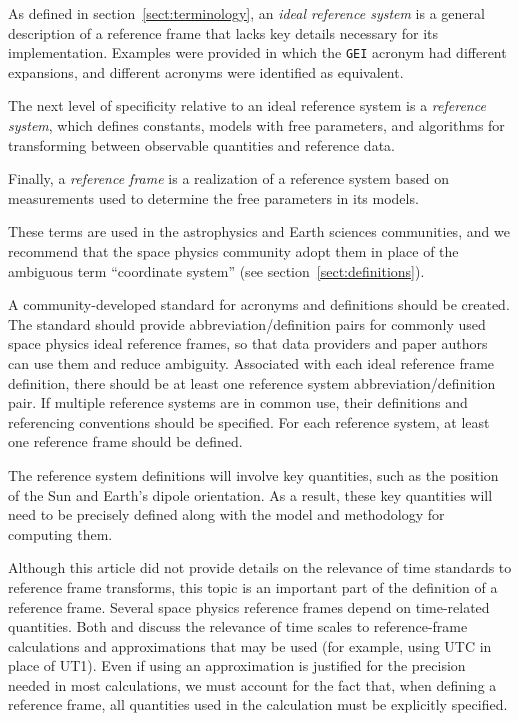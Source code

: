 \documentclass[draft]{agujournal2019}
\begin{document}
As defined in section~\ref {sect:terminology}, an {\it ideal reference system} is a general description of a reference frame that lacks key details necessary for its implementation. Examples were provided in which the \texttt{GEI} acronym had different expansions, and different acronyms were identified as equivalent.
  
The next level of specificity relative to an ideal reference system is a {\it reference system}, which defines constants, models with free parameters, and algorithms for transforming between observable quantities and reference data. 

Finally, a {\it reference frame} is a realization of a reference system based on measurements used to determine the free parameters in its models. 

These terms are used in the astrophysics and Earth sciences communities, and we recommend that the space physics community adopt them in place of the ambiguous term ``coordinate system'' (see section~\ref{sect:definitions}).

A community-developed standard for acronyms and definitions should be created. The standard should provide abbreviation/definition pairs for commonly used space physics ideal reference frames, so that data providers and paper authors can use them and reduce ambiguity. Associated with each ideal reference frame definition, there should be at least one reference system abbreviation/definition pair. If multiple reference systems are in common use, their definitions and referencing conventions should be specified. For each reference system, at least one reference frame should be defined.

The reference system definitions will involve key quantities, such as the position of the Sun and Earth's dipole orientation. As a result, these key quantities will need to be precisely defined along with the model and methodology for computing them.

Although this article did not provide details on the relevance of time standards to reference frame transforms, this topic is an important part of the definition of a reference frame. Several space physics reference frames depend on time-related quantities. Both  and  discuss the relevance of time scales to reference-frame calculations and approximations that may be used (for example, using UTC in place of UT1). Even if using an approximation is justified for the precision needed in most calculations, we must account for the fact that, when defining a reference frame, all quantities used in the calculation must be explicitly specified. 
\end{document}
